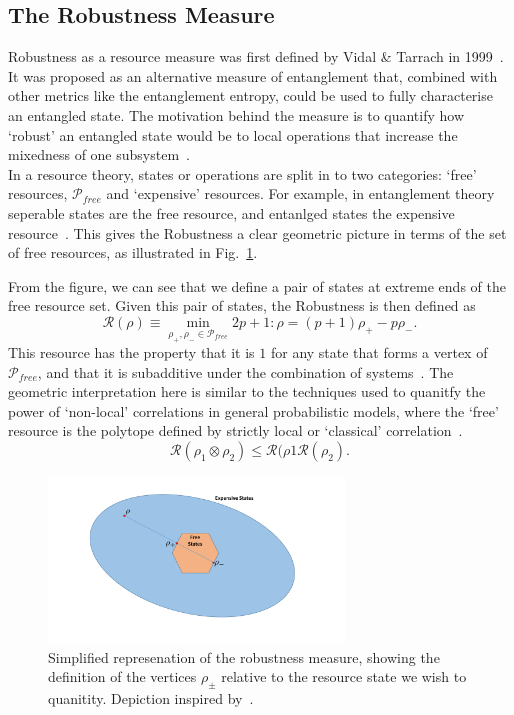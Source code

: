 \documentclass{standalone}
\begin{document}
\subsection{The Robustness Measure}
Robustness as a resource measure was first defined by Vidal \& Tarrach in 1999~\cite{Vidal1999}. It was proposed as an alternative measure of entanglement that, combined with other metrics like the entanglement entropy, could be used to fully characterise an entangled state. The motivation behind the measure is to quantify how `robust' an entangled state would be to local operations that increase the mixedness of one subsystem~\cite{Vidal1999}.\\
In a resource theory, states or operations are split in to two categories: `free' resources, $\mathcal{P}_{free}$ and `expensive' resources. For example, in entanglement theory seperable states are the free resource, and entanlged states the expensive resource~\cite{Vidal1999}. This gives the Robustness a clear geometric picture in terms of the set of free resources, as illustrated in Fig.~\ref{fig:robustshapes}.
\par
From the figure, we can see that we define a pair of states at extreme ends of the free resource set. Given this pair of states, the Robustness is then defined as~\cite{Vidal1999}
\begin{equation}\label{eq:robustness}
    \mathcal{R}(\rho)\equiv\min_{\rho_{+},\rho_{-}\in\mathcal{P}_{free}} 2p+1 : \rho = \left(p+1\right)\rho_{+} - p\rho_{-}.
\end{equation}
This resource has the property that it is $1$ for any state that forms a vertex of $\mathcal{P}_{free}$, and that it is subadditive under the combination of systems~\cite{Vidal1999,Howard2016}. The geometric interpretation here is similar to the techniques used to quanitfy the power of `non-local' correlations in general probabilistic models, where the `free' resource is the polytope defined by strictly local or `classical' correlation~\cite{Acin2006}.
\[\mathcal{R}(\rho_{1}\otimes\rho_{2})\leq \mathcal{R}(\rho{1}\mathcal{R}(\rho_{2}).\]
\par
\begin{figure}[h]
    \centering
    \includegraphics[width=0.7\textwidth]{Figures/Robustness.pdf}
    \caption{Simplified represenation of the robustness measure, showing the definition of the vertices $\rho_{\pm}$ relative to the resource state we wish to quanitity. Depiction inspired by~\cite{Vidal1999,Howard2016}.}
\label{fig:robustshapes}
\end{figure}
\end{document}
